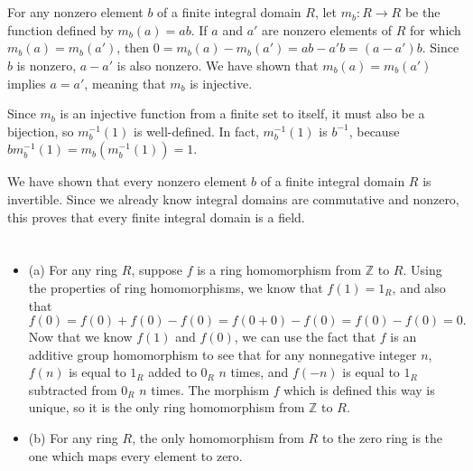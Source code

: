 \documentclass[12pt]{article}
\begin{document}
\section{}
\noindent{}\bigskip
\par
For any nonzero element $b$ of a finite integral domain $R$, let $m_b:R \rightarrow R$ be the function defined by $m_b(a)=ab$. If $a$ and $a'$ are nonzero elements of $R$ for which $m_b(a)=m_b(a')$, then $0=m_b(a)-m_b(a')=ab-a'b=(a-a')b$. Since $b$ is nonzero, $a-a'$ is also nonzero. We have shown that $m_b(a)=m_b(a')$ implies $a=a'$, meaning that $m_b$ is injective.
\par
Since $m_b$ is an injective function from a finite set to itself, it must also be a bijection, so $m_b^{-1}(1)$ is well-defined. In fact, $m_b^{-1}(1)$ is $b^{-1}$, because $b m_b^{-1}(1) = m_b(m_b^{-1}(1)) = 1$.
\par
We have shown that every nonzero element $b$ of a finite integral domain $R$ is invertible. Since we already know integral domains are commutative and nonzero, this proves that every finite integral domain is a field.

\section{}
\noindent{}\bigskip
\par
\begin{itemize}
    \item (a) For any ring $R$, suppose $f$ is a ring homomorphism from $ \mathbb{Z}$ to $R$. Using the properties of ring homomorphisms, we know that $f(1)=1_R$, and also that
        \[ f(0)=f(0)+f(0)-f(0)=f(0+0)-f(0)=f(0)-f(0)=0. \]
        Now that we know $f(1)$ and $f(0)$, we can use the fact that $f$ is an additive group homomorphism to see that for any nonnegative integer $n$, $f(n)$ is equal to $1_R$ added to $0_R$ $n$ times, and $f(-n)$ is equal to $1_R$ subtracted from $0_R$ $n$ times. The morphism $f$ which is defined this way is unique, so it is the only ring homomorphism from $ \mathbb{Z}$ to $R$.
    \item (b) For any ring $R$, the only homomorphism from $R$ to the zero ring is the one which maps every element to zero.
\end{itemize}
\end{document}
